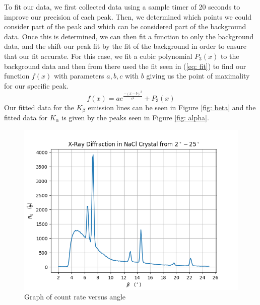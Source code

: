 \documentclass[twocolumn]{article}
\begin{document}
			To fit our data, we first collected data using a sample timer of 20 seconds to improve our precision of each peak. Then, we determined which points we could consider part of the peak and which can be considered part of the background data. Once this is determined, we can then fit a function to only the background data, and the shift our peak fit by the fit of the background in order to ensure that our fit accurate. For this case, we fit a cubic polynomial $P_3(x)$ to the background data and then from there used the fit seen in (\ref{eq: fit}) to find our function $f(x)$ with parameters $a, b, c$ with $b$ giving us the point of maximality for our specific peak.
			\begin{equation}
				f(x) = ae^{\frac{-(x-b)^2}{c^2}} + P_3(x) \label{eq: fit}
			\end{equation}	
			Our fitted data for the $K_\beta$ emission lines can be seen in Figure \ref{fig: beta} and the fitted data for $K_\alpha$ is given by the peaks seen in Figure \ref{fig: alpha}.
			\begin{figure}
				\centering
				\includegraphics[width = .5\textwidth]{../Graphs/FullData}
				\caption{Graph of count rate versus angle }
				\label{fulldata}
			\end{figure}
			
\end{document}
